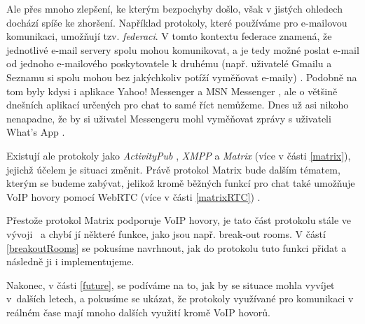 Ale přes mnoho zlepšení, ke kterým bezpochyby došlo, však v jistých ohledech
dochází spíše ke zhoršení. Například protokoly, které používáme pro e-mailovou
komunikaci, umožňují tzv. \textit{federaci}. V tomto kontextu federace znamená,
že jednotlivé e-mail servery spolu mohou komunikovat, a je tedy možné poslat
e-mail od jednoho e-mailového poskytovatele k druhému (např. uživatelé Gmailu a
Seznamu si spolu mohou bez jakýchkoliv potíží vyměňovat e-maily)
\parencite{MatrixORG-FAQ}. Podobně na tom byly kdysi i aplikace Yahoo! Messenger a
MSN Messenger \parencite{BetaNews-MSYahooToLinkIMNets}, ale o většině dnešních
aplikací určených pro chat to samé říct nemůžeme. Dnes už asi nikoho nenapadne,
že by si uživatel Messengeru mohl vyměňovat zprávy s uživateli What's App
\parencite{9To5Mac-InteroperabilityNightmareAndDream}.

Existují ale protokoly jako \textit{ActivityPub} \parencite{W3ORG-ActivityPub},
\textit{XMPP} \parencite{XMPPORG-Homepage} a \textit{Matrix}
\parencite{MatrixORG-Homepage} (více v části \ref{matrix}), jejichž účelem je situaci
změnit. Právě protokol Matrix bude dalším tématem, kterým se budeme zabývat,
jelikož kromě běžných funkcí pro chat také umožňuje VoIP hovory pomocí WebRTC
(více v části \ref{matrixRTC}) \parencite{MatrixORG-Homepage,MatrixORG-Spec}.

Přestože protokol Matrix podporuje VoIP hovory, je tato část protokolu stále
ve vývoji~\parencite{GitHub-MSC3401,GitHub-MSC3898} a chybí jí některé funkce, jako
jsou např. break-out rooms. V částí \ref{breakoutRooms} se pokusíme navrhnout,
jak do protokolu tuto funkci přidat a následně ji i implementujeme.

Nakonec, v části \ref{future}, se podíváme na to, jak by se situace mohla
vyvíjet v~dalších letech, a pokusíme se ukázat, že protokoly využívané pro
komunikaci v reálném čase mají mnoho dalších využití kromě VoIP hovorů.
